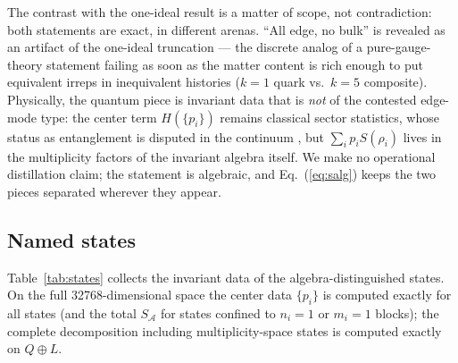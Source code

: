 \documentclass[11pt]{article}
\newcommand{\SA}{S_{\mathcal{A}}}
\begin{document}
The contrast with the one-ideal result is a matter of scope, not contradiction: both statements are exact, in different arenas. ``All edge, no bulk'' is revealed as an artifact of the one-ideal truncation --- the discrete analog of a pure-gauge-theory statement failing as soon as the matter content is rich enough to put equivalent irreps in inequivalent histories ($k=1$ quark vs.\ $k=5$ composite). Physically, the quantum piece is invariant data that is \emph{not} of the contested edge-mode type: the center term $H(\{p_i\})$ remains classical sector statistics, whose status as entanglement is disputed in the continuum \cite{chmp,soni}, but $\sum_i p_i S(\rho_i)$ lives in the multiplicity factors of the invariant algebra itself. We make no operational distillation claim; the statement is algebraic, and Eq.~(\ref{eq:salg}) keeps the two pieces separated wherever they appear.

\subsection{Named states}

Table~\ref{tab:states} collects the invariant data of the algebra-distinguished states. On the full 32768-dimensional space the center data $\{p_i\}$ is computed exactly for all states (and the total $\SA$ for states confined to $n_i=1$ or $m_i=1$ blocks); the complete decomposition including multiplicity-space states is computed exactly on $Q\oplus L$.
\end{document}
